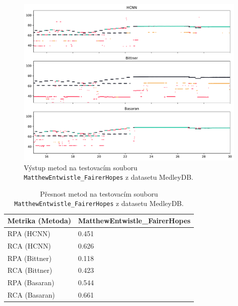 \begin{figure}[h]\centering
\includegraphics[width=\textwidth,height=\textheight,keepaspectratio]{../img/vysledky/mdb_MatthewEntwistle_FairerHopes}
\caption{Výstup metod na testovacím souboru \texttt{MatthewEntwistle\_FairerHopes} z datasetu MedleyDB.}
\label{obr:mdb_MatthewEntwistle_FairerHopes}
\end{figure}

\begin{table}[h!]
\centering

  \begin{tabular}{ll}
  \toprule
  Metrika (Metoda) & MatthewEntwistle\_FairerHopes \\
  \midrule
        RPA (HCNN) &                        0.451 \\
        RCA (HCNN) &                        0.626 \\
    RPA (Bittner) &                        0.118 \\
    RCA (Bittner) &                        0.423 \\
    RPA (Basaran) &                        0.544 \\
    RCA (Basaran) &                        0.661 \\
  \bottomrule
  \end{tabular}

\caption{Přesnost metod na testovacím souboru \texttt{MatthewEntwistle\_FairerHopes} z datasetu MedleyDB.}\label{tab:mdb_MatthewEntwistle_FairerHopes}
\end{table}






